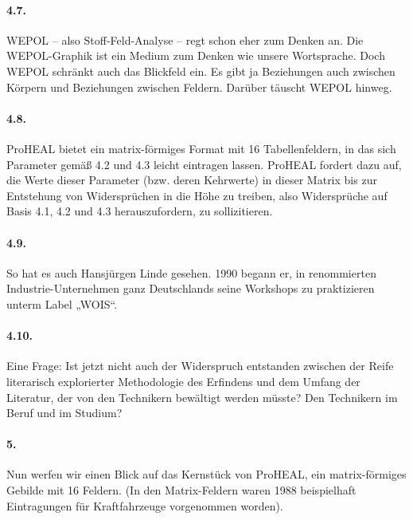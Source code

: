 \documentclass[12pt,a4paper]{article}
\begin{document}
\paragraph{4.7.}
WEPOL – also Stoff-Feld-Analyse – regt schon eher zum Denken an. Die
WEPOL-Graphik ist ein Medium zum Denken wie unsere Wortsprache. Doch WEPOL
schränkt auch das Blickfeld ein. Es gibt ja Beziehungen auch zwischen Körpern
und Beziehungen zwischen Feldern. Darüber täuscht WEPOL hinweg.

\paragraph{4.8.}
ProHEAL bietet ein matrix-förmiges Format mit 16 Tabellenfeldern, in das
sich Parameter gemäß 4.2 und 4.3 leicht eintragen lassen. ProHEAL fordert dazu
auf, die Werte dieser Parameter (bzw. deren Kehrwerte) in dieser Matrix bis
zur Entstehung von Widersprüchen in die Höhe zu treiben, also Widersprüche
auf Basis 4.1, 4.2 und 4.3 herauszufordern, zu sollizitieren.

\paragraph{4.9.}
So hat es auch Hansjürgen Linde gesehen. 1990 begann er, in renommierten
Industrie-Unternehmen ganz Deutschlands seine Workshops zu praktizieren unterm
Label „WOIS“.

\paragraph{4.10.}
Eine Frage: Ist jetzt nicht auch der Widerspruch entstanden zwischen der
Reife literarisch explorierter Methodologie des Erfindens und dem Umfang der
Literatur, der von den Technikern bewältigt werden müsste? Den Technikern im
Beruf und im Studium?

\paragraph{5.}
Nun werfen wir einen Blick auf das Kernstück von ProHEAL, ein
matrix-förmiges Gebilde mit 16 Feldern. (In den Matrix-Feldern waren 1988
beispielhaft Eintragungen für Kraftfahrzeuge vorgenommen worden).
\end{document}
